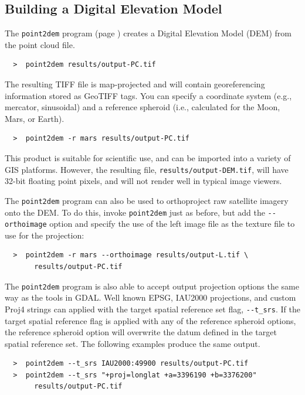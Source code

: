 \subsection{Building a Digital Elevation Model}

The \texttt{point2dem} program (page \pageref{point2dem}) creates a
Digital Elevation Model (\ac{DEM}) from the point cloud file.

\begin{verbatim}
  >  point2dem results/output-PC.tif
\end{verbatim}

\noindent
The resulting TIFF file is map-projected and will contain
georeferencing information stored as GeoTIFF tags. You can specify a
coordinate system (e.g., mercator, sinusoidal) and a reference
spheroid (i.e., calculated for the Moon, Mars, or Earth).

\begin{verbatim}
  >  point2dem -r mars results/output-PC.tif
\end{verbatim}

\noindent
This product is suitable for scientific use, and can be imported into
a variety of GIS platforms.  However, the resulting file,
\texttt{results/output-DEM.tif}, will have 32-bit floating point
pixels, and will not render well in typical image viewers.

The \texttt{point2dem} program can also be used to orthoproject raw
satellite imagery onto the \ac{DEM}. To do this, invoke
\texttt{point2dem} just as before, but add the \texttt{-\/-orthoimage}
option and specify the use of the left image file as the texture file
to use for the projection:

\begin{verbatim}
  >  point2dem -r mars --orthoimage results/output-L.tif \
       results/output-PC.tif
\end{verbatim}

\noindent
The \texttt{point2dem} program is also able to accept output
projection options the same way as the tools in GDAL. Well known EPSG,
IAU2000 projections, and custom Proj4 strings can applied with the
target spatial reference set flag, \texttt{-\/-t\_srs}. If the target
spatial reference flag is applied with any of the reference spheroid
options, the reference spheroid option will overwrite the datum
defined in the target spatial reference set. The following examples
produce the same output.

\begin {verbatim}
  >  point2dem --t_srs IAU2000:49900 results/output-PC.tif
  >  point2dem --t_srs "+proj=longlat +a=3396190 +b=3376200"
       results/output-PC.tif
\end{verbatim}


